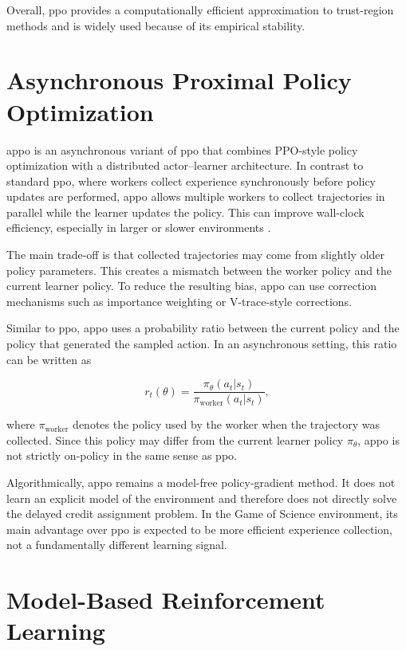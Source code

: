 \documentclass[english,bachelor]{hsluthesis}
\begin{document}
Overall, \gls{ppo} provides a computationally efficient approximation to trust-region methods and is widely used because of its empirical stability.

\section{Asynchronous Proximal Policy Optimization}

\gls{appo} is an asynchronous variant of \gls{ppo} that combines PPO-style policy optimization with a distributed actor--learner architecture. In contrast to standard \gls{ppo}, where workers collect experience synchronously before policy updates are performed, \gls{appo} allows multiple workers to collect trajectories in parallel while the learner updates the policy. This can improve wall-clock efficiency, especially in larger or slower environments \cite{DBLP:journals/corr/abs-1912-00167}.

The main trade-off is that collected trajectories may come from slightly older policy parameters. This creates a mismatch between the worker policy and the current learner policy. To reduce the resulting bias, \gls{appo} can use correction mechanisms such as importance weighting or V-trace-style corrections.

Similar to \gls{ppo}, \gls{appo} uses a probability ratio between the current policy and the policy that generated the sampled action. In an asynchronous setting, this ratio can be written as

\begin{equation}
r_t(\theta) =
\frac{\pi_\theta(a_t|s_t)}
{\pi_{\text{worker}}(a_t|s_t)},
\end{equation}

where $\pi_{\text{worker}}$ denotes the policy used by the worker when the trajectory was collected. Since this policy may differ from the current learner policy $\pi_\theta$, \gls{appo} is not strictly on-policy in the same sense as \gls{ppo}.

Algorithmically, \gls{appo} remains a model-free policy-gradient method. It does not learn an explicit model of the environment and therefore does not directly solve the delayed credit assignment problem. In the Game of Science environment, its main advantage over \gls{ppo} is expected to be more efficient experience collection, not a fundamentally different learning signal.

\section{Model-Based Reinforcement Learning}
\end{document}
